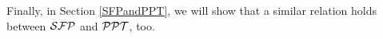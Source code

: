  Finally, in Section \ref{SFPandPPT}, we will show that a similar
 relation holds between $\mathcal{SFP}$ and $\mathcal{PPT}$, too.






















































































































